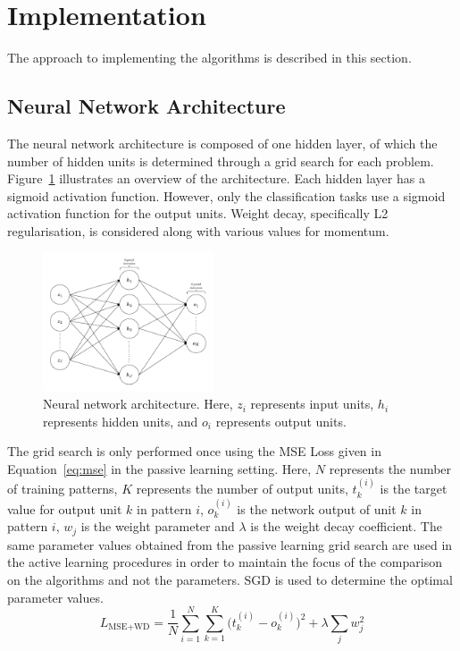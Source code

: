 \documentclass[10pt, conference]{IEEEtran}
\begin{document}
\section{Implementation}

The approach to implementing the algorithms is described in this section.

\subsection{Neural Network Architecture}
The neural network architecture is composed of one hidden layer, of which the number of hidden units is determined through a grid search for each problem. Figure~\ref{fig:nnarch} illustrates an overview of the architecture. Each hidden layer has a sigmoid activation function. However, only the classification tasks use a sigmoid activation function for the output units. Weight decay, specifically L2 regularisation, is considered along with various values for momentum.

\begin{figure}[htbp]
	\centering
	\includegraphics[width=0.45\textwidth]{images/NNarch.pdf}
	\caption{Neural network architecture. Here, $z_i$ represents input units, $h_i$ represents hidden units, and $o_i$ represents output units.}
	\label{fig:nnarch}
\end{figure}

The grid search is only performed once using the MSE Loss given in Equation~\ref{eq:mse} in the passive learning setting. Here, $N$ represents the number of training patterns, $K$ represents the number of output units, $t_k^{(i)}$ is the target value for output unit $k$ in pattern $i$, $o_k^{(i)}$ is the network output of unit $k$ in pattern $i$, $w_j$ is the weight parameter and $\lambda$ is the weight decay coefficient. The same parameter values obtained from the passive learning grid search are used in the active learning procedures in order to maintain the focus of the comparison on the algorithms and not the parameters. SGD is used to determine the optimal parameter values.
\begin{equation}
L_{\text{MSE+WD}} = \frac{1}{N} \sum_{i=1}^{N} \sum_{k=1}^{K} \big( t_{k}^{(i)} - o_{k}^{(i)} \big)^2
+\lambda \sum_{j} w_j^2
\label{eq:mse}
\end{equation}
\end{document}
